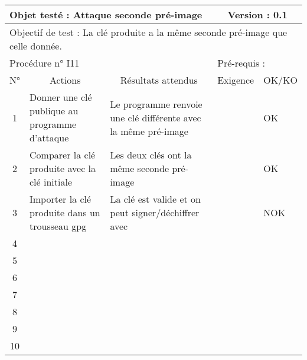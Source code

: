 \documentclass{../res/univ-projet}
\begin{document}
\begin{center}
    \begin{tabular}{|c|p{5cm}|p{5cm}|p{1.5cm}|p{1.5cm}|}
      \hline
      \multicolumn{3}{|l|}{Objet testé : Attaque seconde pré-image} & \multicolumn{2}{c|}{Version : 0.1}\\ \hline
      \multicolumn{5}{|l|}{Objectif de test : La clé produite a la même seconde pré-image que celle donnée.}\\ \hline
      \multicolumn{3}{|l|}{Procédure n° I11} & \multicolumn{2}{p{3cm}|}{Pré-requis : }\\ \hline
      \multicolumn{1}{|c|}{N°} & \multicolumn{1}{c|}{Actions} & \multicolumn{1}{c|}{Résultats attendus} & 
      \multicolumn{1}{c|}{Exigence} & \multicolumn{1}{c|}{OK/KO}\\ \hline
      1 & Donner une clé publique au programme d'attaque & Le programme renvoie une clé différente avec la même pré-image &  & OK \\
      2 & Comparer la clé produite avec la clé initiale & Les deux clés ont la même seconde pré-image &  & OK \\
      3 & Importer la clé produite dans un trousseau gpg & La clé est valide et on peut signer/déchiffrer avec &  & NOK\\ 
      4 &  &  &  & \\
      5 &  &  &  & \\
      6 &  &  &  & \\
      7 &  &  &  & \\
      8 &  &  &  & \\
      9 &  &  &  & \\
      10 &  &  &  &\\ 
	\hline
    \end{tabular}
    \vskip 2.2cm


\end{center}
\end{document}
